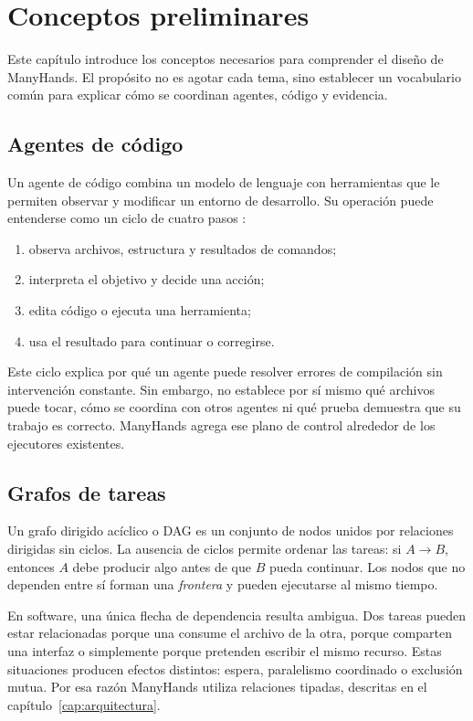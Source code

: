 \chapter{Conceptos preliminares}
\label{cap:preliminares}

Este capítulo introduce los conceptos necesarios para comprender el diseño de
ManyHands. El propósito no es agotar cada tema, sino establecer un vocabulario
común para explicar cómo se coordinan agentes, código y evidencia.

\section{Agentes de código}

Un agente de código combina un modelo de lenguaje con herramientas que le
permiten observar y modificar un entorno de desarrollo. Su operación puede
entenderse como un ciclo de cuatro pasos \cite{yao2023react,wang2024survey}:

\begin{enumerate}
  \item observa archivos, estructura y resultados de comandos;
  \item interpreta el objetivo y decide una acción;
  \item edita código o ejecuta una herramienta;
  \item usa el resultado para continuar o corregirse.
\end{enumerate}

Este ciclo explica por qué un agente puede resolver errores de compilación sin
intervención constante. Sin embargo, no establece por sí mismo qué archivos
puede tocar, cómo se coordina con otros agentes ni qué prueba demuestra que su
trabajo es correcto. ManyHands agrega ese plano de control alrededor de los
ejecutores existentes.

\section{Grafos de tareas}

Un grafo dirigido acíclico o DAG es un conjunto de nodos unidos por relaciones
dirigidas sin ciclos. La ausencia de ciclos permite ordenar las tareas: si
$A \rightarrow B$, entonces $A$ debe producir algo antes de que $B$ pueda
continuar. Los nodos que no dependen entre sí forman una \emph{frontera} y
pueden ejecutarse al mismo tiempo.

En software, una única flecha de dependencia resulta ambigua. Dos tareas pueden
estar relacionadas porque una consume el archivo de la otra, porque comparten
una interfaz o simplemente porque pretenden escribir el mismo recurso. Estas
situaciones producen efectos distintos: espera, paralelismo coordinado o
exclusión mutua. Por esa razón ManyHands utiliza relaciones tipadas, descritas
en el capítulo~\ref{cap:arquitectura}.

